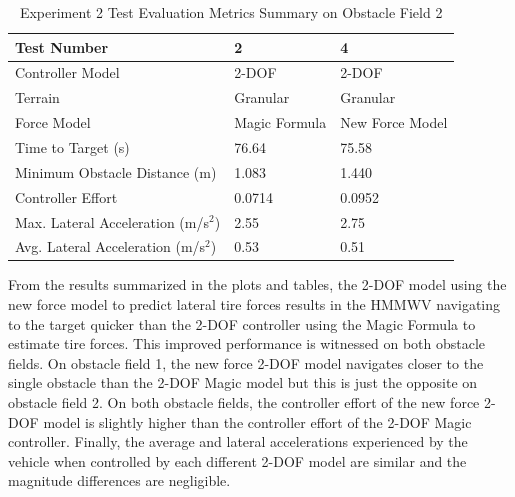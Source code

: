 \documentclass[12pt,onecolumn]{report}
\begin{document}
\begin{table}
		\centering
\begin{tabular}{ ||p{6cm}|p{3.5cm}|p{3.5cm}||  }
		\hline
		Test Number & 2 & 4 \\
		\hline
		Controller Model & 2-DOF & 2-DOF \\
		\hline
		Terrain & Granular & Granular\\
		\hline
		Force Model & Magic Formula & New Force Model\\
		\hline
		Time to Target (s)  & 76.64 & 75.58 \\ 
		\hline
		Minimum Obstacle Distance (m) & 1.083 & 1.440 \\
		\hline
		Controller Effort & 0.0714 & 0.0952 \\
		\hline
		Max. Lateral Acceleration (m/s$^{2}$)& 2.55 & 2.75 \\
		\hline
		Avg. Lateral Acceleration (m/s$^{2}$) & 0.53 & 0.51 \\
		\hline
\end{tabular}
\caption{Experiment 2 Test Evaluation Metrics Summary on Obstacle Field 2}
\label{t:EvalMetricsObst2Exp2}
\end{table}

From the results summarized in the plots and tables, the 2-DOF model using the new force model to predict lateral tire forces results in the HMMWV navigating to the target quicker than the 2-DOF controller using the Magic Formula to estimate tire forces. This improved performance is witnessed on both obstacle fields. On obstacle field 1, the new force 2-DOF model navigates closer to the single obstacle than the 2-DOF Magic model but this is just the opposite on obstacle field 2. On both obstacle fields, the controller effort of the new force 2-DOF model is slightly higher than the controller effort of the 2-DOF Magic controller. Finally, the average and lateral accelerations experienced by the vehicle when controlled by each different 2-DOF model are similar and the magnitude differences are negligible. 
\end{document}
